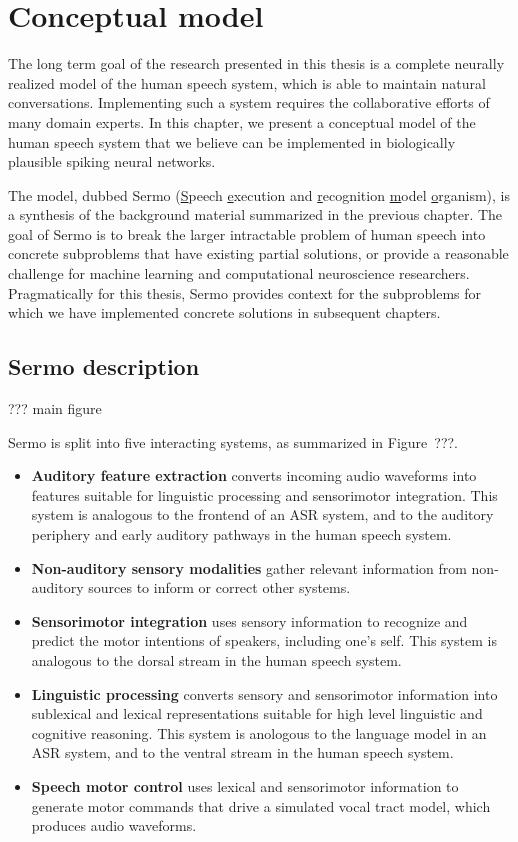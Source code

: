 \chapter{Conceptual model}
\label{chapt:model}

The long term goal of the research
presented in this thesis
is a complete neurally realized model
of the human speech system,
which is able to maintain
natural conversations.
Implementing such a system
requires the collaborative efforts
of many domain experts.
In this chapter, we present
a conceptual model of the human speech system
that we believe can be implemented
in biologically plausible spiking neural networks.

The model, dubbed Sermo
(\underline{S}peech \underline{e}xecution and \underline{r}ecognition
\underline{m}odel \underline{o}rganism),
is a synthesis of the background material
summarized in the previous chapter.
The goal of Sermo
is to break the larger
intractable problem of human speech
into concrete subproblems
that have existing partial solutions,
or provide a reasonable challenge
for machine learning
and computational neuroscience researchers.
Pragmatically for this thesis,
Sermo provides context for
the subproblems for which
we have implemented concrete solutions
in subsequent chapters.

\section{Sermo description}

??? main figure

Sermo is split into five interacting systems,
as summarized in Figure~???.
\begin{itemize}
  \item \textbf{Auditory feature extraction}
    converts incoming audio waveforms into
    features suitable for linguistic processing
    and sensorimotor integration.
    This system is analogous to the frontend
    of an ASR system,
    and to the auditory periphery and
    early auditory pathways in the human speech system.
  \item \textbf{Non-auditory sensory modalities}
    gather relevant information
    from non-auditory sources
    to inform or correct other systems.
  \item \textbf{Sensorimotor integration}
    uses sensory information to
    recognize and predict the motor intentions
    of speakers, including one's self.
    This system is analogous to the
    dorsal stream in the human speech system.
  \item \textbf{Linguistic processing}
    converts sensory and sensorimotor information
    into sublexical and lexical representations
    suitable for high level linguistic
    and cognitive reasoning.
    This system is anologous to
    the language model in an ASR system,
    and to the ventral stream
    in the human speech system.
  \item \textbf{Speech motor control}
    uses lexical and sensorimotor information
    to generate motor commands
    that drive a simulated vocal tract model,
    which produces audio waveforms.
\end{itemize}

